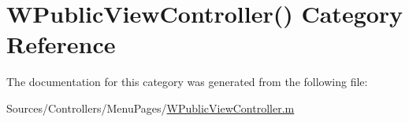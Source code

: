 \hypertarget{category_w_public_view_controller_07_08}{\section{W\-Public\-View\-Controller() Category Reference}
\label{category_w_public_view_controller_07_08}
}


The documentation for this category was generated from the following file\-:\begin{DoxyCompactItemize}
\item 
Sources/\-Controllers/\-Menu\-Pages/\hyperlink{_w_public_view_controller_8m}{W\-Public\-View\-Controller.\-m}\end{DoxyCompactItemize}
